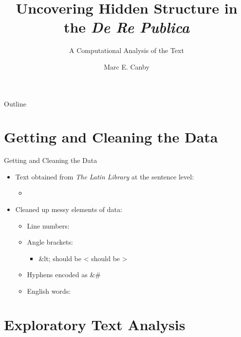 \documentclass{beamer}
\title{Uncovering Hidden Structure in the \textit{De Re Publica}}
\subtitle{A Computational Analysis of the Text}
\author{Marc E. Canby}
\institute[] %
{
	\inst{}%
	Lati 318 $-$ Cicero: \textit{De Re Publica}\\
	Rice University

}
\date{}
\begin{document}
\begin{frame}
\titlepage
\end{frame}

\begin{frame}{Outline}
\tableofcontents
\end{frame}

\section{Getting and Cleaning the Data}

\begin{frame}{Getting and Cleaning the Data}


\begin{itemize}
	\setlength\itemsep{1em}
	\item Text obtained from \textit{The Latin Library} at the sentence level:
	\begin{itemize}
		\item {}
	\end{itemize}
\item Cleaned up messy elements of data:
\begin{itemize}
	\setlength\itemsep{0.5em}
	\item Line numbers: {\ttfamily [1,2,...,71]}
	\item Angle brackets: {}
	\begin{itemize}
		\item {\ttfamily \&lt;} should be {\ttfamily <}  should be {\ttfamily >}
	\end{itemize}
\item Hyphens encoded as {\ttfamily \&\#}
\item English words: {}
\end{itemize}
\end{itemize}

\end{frame}




\section{Exploratory Text Analysis}
\end{document}
